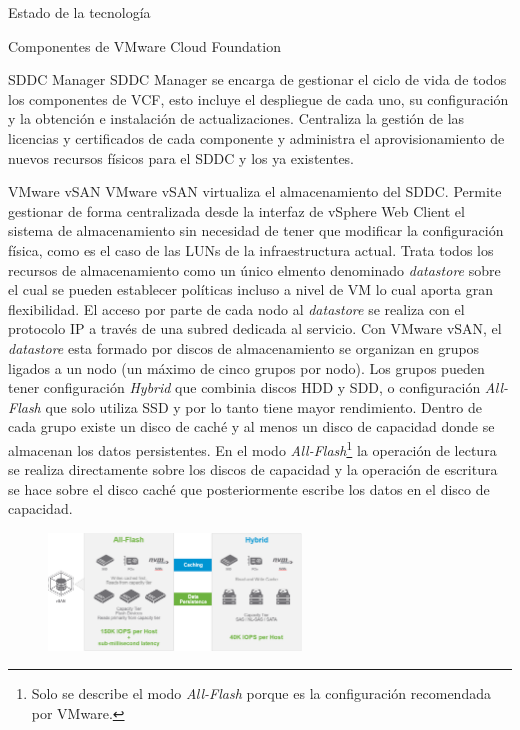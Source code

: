 \begin{section}{Estado de la tecnología}
\begin{subsection}{Componentes de VMware Cloud Foundation \cite{componentesCloudFound}}
\begin{subsubsection}{SDDC Manager}
    SDDC Manager se encarga de gestionar el ciclo de vida de todos los componentes de VCF, esto incluye el despliegue de cada uno, su configuración y la obtención e instalación de actualizaciones. Centraliza la gestión de las licencias y certificados de cada componente y administra el aprovisionamiento de nuevos recursos físicos para el SDDC y los ya existentes.
\end{subsubsection}
\begin{subsubsection}{VMware vSAN}
    VMware vSAN virtualiza el almacenamiento del SDDC. Permite gestionar de forma centralizada desde la interfaz de vSphere Web Client el sistema de almacenamiento sin necesidad de tener que modificar la configuración física, como es el caso de las LUNs de la infraestructura actual. Trata todos los recursos de almacenamiento como un único elmento denominado \textit{datastore} sobre el cual se pueden establecer políticas incluso a nivel de VM lo cual aporta gran flexibilidad. El acceso por parte de cada nodo al \textit{datastore} se realiza con el protocolo IP a través de una subred dedicada al servicio. Con VMware vSAN, el \textit{datastore} esta formado por discos de almacenamiento se organizan en grupos ligados a un nodo (un máximo de cinco grupos por nodo). Los grupos pueden tener configuración \textit{Hybrid} que combinia discos HDD y SDD, o configuración \textit{All-Flash} que solo utiliza SSD y por lo tanto tiene mayor rendimiento. Dentro de cada grupo existe un disco de caché y al menos un disco de capacidad donde se almacenan los datos persistentes\cite{operacionesVSAN}. En el modo \textit{All-Flash}\footnote{Solo se describe el modo \textit{All-Flash} porque es la configuración recomendada por VMware.} la operación de lectura se realiza directamente sobre los discos de capacidad y la operación de escritura se hace sobre el disco caché que posteriormente escribe los datos en el disco de capacidad.
    \begin{figure}[h!]
    \centering
        \includegraphics[width=0.6\textwidth]{imaxes/cap2recursos/rendimientoVSAN.png}

\end{figure}
\end{subsubsection}
\end{subsection}
\end{section}
